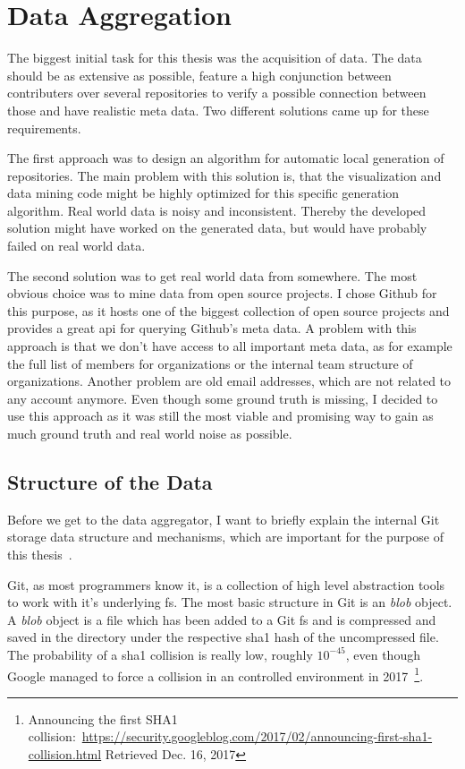 \chapter{Data Aggregation}

The biggest initial task for this thesis was the acquisition of data.
The data should be as extensive as possible, feature a high conjunction between contributers over several repositories to verify a possible connection between those and have realistic meta data.
Two different solutions came up for these requirements.

The first approach was to design an algorithm for automatic local generation of repositories.
The main problem with this solution is, that the visualization and data mining code might be highly optimized for this specific generation algorithm.
Real world data is noisy and inconsistent. Thereby the developed solution might have worked on the generated data, but would have probably failed on real world data.

The second solution was to get real world data from somewhere. The most obvious choice was to mine data from open source projects.
I chose Github for this purpose, as it hosts one of the biggest collection of open source projects and provides a great \ac{api} for querying Github's meta data.
A problem with this approach is that we don't have access to all important meta data, as for example the full list of members for organizations or the internal team structure of organizations.
Another problem are old email addresses, which are not related to any account anymore.
Even though some ground truth is missing, I decided to use this approach as it was still the most viable and promising way to gain as much ground truth and real world noise as possible.


\section{Structure of the Data}

Before we get to the data aggregator, I want to briefly explain the internal Git storage data structure and mechanisms, which are important for the purpose of this thesis~\cite{book:pro-git}.

Git, as most programmers know it, is a collection of high level abstraction tools to work with it's underlying \ac{fs}.
The most basic structure in Git is an \emph{blob} object.
A \emph{blob} object is a file which has been added to a Git \ac{fs} and is compressed and saved in the  directory under the respective \ac{sha1} hash of the uncompressed file.
The probability of a \ac{sha1} collision is really low, roughly $10^{-45}$, even though Google managed to force a collision in an controlled environment in 2017~\footnote{Announcing the first SHA1 collision:~\url{https://security.googleblog.com/2017/02/announcing-first-sha1-collision.html} Retrieved Dec. 16, 2017}.

